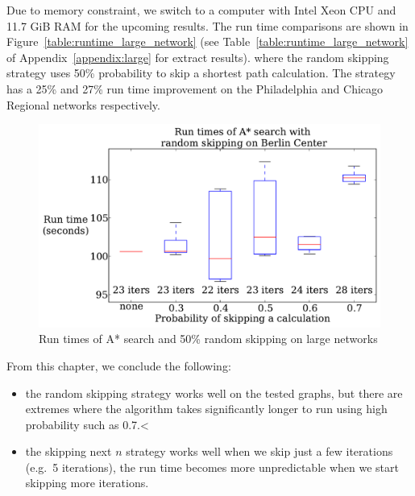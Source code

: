 Due to memory constraint, we switch to a computer with Intel Xeon CPU and 11.7 GiB RAM for the upcoming results.
The run time comparisons are shown in Figure~\ref{table:runtime_large_network} (see Table~\ref{table:runtime_large_network} of Appendix~\ref{appendix:large} for extract results).
where the random skipping strategy uses 50\% probability to skip a shortest path calculation.
The strategy has a 25\% and 27\% run time improvement on the Philadelphia and Chicago Regional networks respectively.


\begin{figure}[!ht]
    \centering
    \includegraphics[page=5,width=\textwidth]{img/random_time}
    \caption{Run times of A* search and 50\% random skipping on large networks}
    \label{fig:large_random_n}
\end{figure}

From this chapter, we conclude the following:
\begin{itemize}
    \item the random skipping strategy works well on the tested graphs,
but there are extremes where the algorithm takes significantly longer to run using high probability such as 0.7.<
    \item the skipping next $n$ strategy works well when we skip just a few iterations (e.g.\ 5 iterations), the run time becomes more unpredictable when we start skipping more iterations.
\end{itemize}


